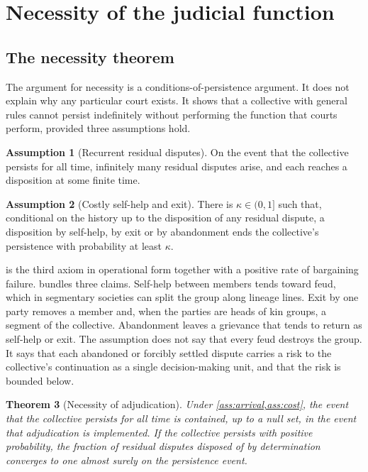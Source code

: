 \documentclass[11pt,letterpaper]{article}
\newtheorem{theorem}{Theorem}[section]
\theoremstyle{definition}
\newtheorem{assumption}[theorem]{Assumption}
\theoremstyle{remark}
\begin{document}
\section{Necessity of the judicial function}
\label{sec:necessity}

\subsection{The necessity theorem}

The argument for necessity is a conditions-of-persistence argument. It does not explain why any particular court exists. It shows that a collective with general rules cannot persist indefinitely without performing the function that courts perform, provided three assumptions hold.

\begin{assumption}[Recurrent residual disputes]
\label{ass:arrival}
On the event that the collective persists for all time, infinitely many residual disputes arise, and each reaches a disposition at some finite time.
\end{assumption}

\begin{assumption}[Costly self-help and exit]
\label{ass:cost}
There is $\kappa\in(0,1]$ such that, conditional on the history up to the disposition of any residual dispute, a disposition by self-help, by exit or by abandonment ends the collective's persistence with probability at least $\kappa$.
\end{assumption}

 is the third axiom in operational form together with a positive rate of bargaining failure.  bundles three claims. Self-help between members tends toward feud, which in segmentary societies can split the group along lineage lines. Exit by one party removes a member and, when the parties are heads of kin groups, a segment of the collective. Abandonment leaves a grievance that tends to return as self-help or exit. The assumption does not say that every feud destroys the group. It says that each abandoned or forcibly settled dispute carries a risk to the collective's continuation as a single decision-making unit, and that the risk is bounded below.

\begin{theorem}[Necessity of adjudication]
\label{thm:judicial-power:necessity}
Under \cref{ass:arrival,ass:cost}, the event that the collective persists for all time is contained, up to a null set, in the event that adjudication is implemented. If the collective persists with positive probability, the fraction of residual disputes disposed of by determination converges to one almost surely on the persistence event.
\end{theorem}
\end{document}
